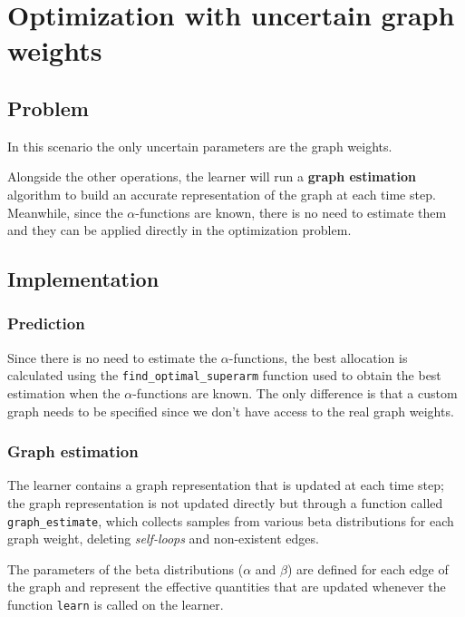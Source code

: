 \chapter{Optimization with uncertain graph weights}
\label{chap:unc_weights}

\section{Problem}
\label{sec:unc_w_problem}

In this scenario the only uncertain parameters are the graph weights.

Alongside the other operations, the learner will run a \textbf{graph estimation} algorithm to build an accurate representation of the graph at each time step.
Meanwhile, since the $\alpha$-functions are known, there is no need to estimate them and they can be applied directly in the optimization problem.

\section{Implementation}
\label{sec:unc_w_impl}

\subsection{Prediction}

Since there is no need to estimate the $\alpha$-functions, the best allocation is calculated using the \texttt{find\_optimal\_superarm} function used to obtain the best estimation when the $\alpha$-functions are known.
The only difference is that a custom graph needs to be specified since we don't have access to the real graph weights.

\subsection{Graph estimation}

The learner contains a graph representation that is updated at each time step; the graph representation is not updated directly but through a function called \texttt{graph\_estimate}, which collects samples from various beta distributions for each graph weight, deleting \textit{self-loops} and non-existent edges.

The parameters of the beta distributions ($\alpha$ and $\beta$) are defined for each edge of the graph and represent the effective quantities that are updated whenever the function \texttt{learn} is called on the learner.

